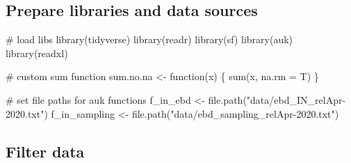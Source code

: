 \documentclass[]{article}
\newenvironment{Shaded}{}{}
\newcommand{\CommentTok}[1]{\textcolor[rgb]{0.00,0.50,0.00}{#1}}
\newcommand{\ControlFlowTok}[1]{\textcolor[rgb]{0.00,0.00,1.00}{#1}}
\newcommand{\DataTypeTok}[1]{#1}
\newcommand{\KeywordTok}[1]{\textcolor[rgb]{0.00,0.00,1.00}{#1}}
\newcommand{\NormalTok}[1]{#1}
\newcommand{\OperatorTok}[1]{#1}
\newcommand{\StringTok}[1]{\textcolor[rgb]{0.00,0.50,0.50}{#1}}
\begin{document}
\hypertarget{prepare-libraries-and-data-sources}{%
\subsection{Prepare libraries and data sources}\label{prepare-libraries-and-data-sources}}

\begin{Shaded}
\begin{Highlighting}[]

\CommentTok{# load libs}
\KeywordTok{library}\NormalTok{(tidyverse)}
\KeywordTok{library}\NormalTok{(readr)}
\KeywordTok{library}\NormalTok{(sf)}
\KeywordTok{library}\NormalTok{(auk)}
\KeywordTok{library}\NormalTok{(readxl)}

\CommentTok{# custom sum function}
\NormalTok{sum.no.na <-}\StringTok{ }\ControlFlowTok{function}\NormalTok{(x) \{}
  \KeywordTok{sum}\NormalTok{(x, }\DataTypeTok{na.rm =}\NormalTok{ T)}
\NormalTok{\}}

\CommentTok{# set file paths for auk functions}
\NormalTok{f_in_ebd <-}\StringTok{ }\KeywordTok{file.path}\NormalTok{(}\StringTok{"data/ebd_IN_relApr-2020.txt"}\NormalTok{)}
\NormalTok{f_in_sampling <-}\StringTok{ }\KeywordTok{file.path}\NormalTok{(}\StringTok{"data/ebd_sampling_relApr-2020.txt"}\NormalTok{)}
\end{Highlighting}
\end{Shaded}

\hypertarget{filter-data}{%
\subsection{Filter data}\label{filter-data}}

\begin{Shaded}
\end{Shaded}
\end{document}
